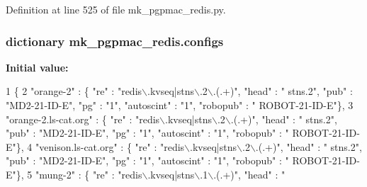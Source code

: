 Definition at line 525 of file mk\-\_\-pgpmac\-\_\-redis.\-py.

\hypertarget{namespacemk__pgpmac__redis_a9dc9b1bd47efd207604312cd60637526}{
\subsubsection[{configs}]{\setlength{\rightskip}{0pt plus 5cm}dictionary mk\-\_\-pgpmac\-\_\-redis.\-configs}}\label{namespacemk__pgpmac__redis_a9dc9b1bd47efd207604312cd60637526}
{\bfseries Initial value\-:}
\begin{DoxyCode}
1 \{
2     \textcolor{stringliteral}{"orange-2"}            : \{ \textcolor{stringliteral}{"re"} : \textcolor{stringliteral}{"redis\(\backslash\).kvseq|stns\(\backslash\).2\(\backslash\).(.+)"}, \textcolor{stringliteral}{"head"} : \textcolor{stringliteral}{"
      stns.2"}, \textcolor{stringliteral}{"pub"} : \textcolor{stringliteral}{"MD2-21-ID-E"}, \textcolor{stringliteral}{"pg"} : \textcolor{stringliteral}{"1"}, \textcolor{stringliteral}{"autoscint"} : \textcolor{stringliteral}{"1"}, \textcolor{stringliteral}{"robopub"} : \textcolor{stringliteral}{"
      ROBOT-21-ID-E"}\},
3     \textcolor{stringliteral}{"orange-2.ls-cat.org"} : \{ \textcolor{stringliteral}{"re"} : \textcolor{stringliteral}{"redis\(\backslash\).kvseq|stns\(\backslash\).2\(\backslash\).(.+)"}, \textcolor{stringliteral}{"head"} : \textcolor{stringliteral}{"
      stns.2"}, \textcolor{stringliteral}{"pub"} : \textcolor{stringliteral}{"MD2-21-ID-E"}, \textcolor{stringliteral}{"pg"} : \textcolor{stringliteral}{"1"}, \textcolor{stringliteral}{"autoscint"} : \textcolor{stringliteral}{"1"}, \textcolor{stringliteral}{"robopub"} : \textcolor{stringliteral}{"
      ROBOT-21-ID-E"}\},
4     \textcolor{stringliteral}{"venison.ls-cat.org"}  : \{ \textcolor{stringliteral}{"re"} : \textcolor{stringliteral}{"redis\(\backslash\).kvseq|stns\(\backslash\).2\(\backslash\).(.+)"}, \textcolor{stringliteral}{"head"} : \textcolor{stringliteral}{"
      stns.2"}, \textcolor{stringliteral}{"pub"} : \textcolor{stringliteral}{"MD2-21-ID-E"}, \textcolor{stringliteral}{"pg"} : \textcolor{stringliteral}{"1"}, \textcolor{stringliteral}{"autoscint"} : \textcolor{stringliteral}{"1"}, \textcolor{stringliteral}{"robopub"} : \textcolor{stringliteral}{"
      ROBOT-21-ID-E"}\},
5     \textcolor{stringliteral}{"mung-2"}              : \{ \textcolor{stringliteral}{"re"} : \textcolor{stringliteral}{"redis\(\backslash\).kvseq|stns\(\backslash\).1\(\backslash\).(.+)"}, \textcolor{stringliteral}{"head"} : \textcolor{stringliteral}{"
}
\end{DoxyCode}
